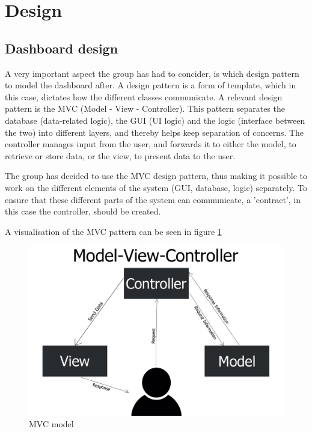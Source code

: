 \section{Design}

\subsection{Dashboard design}
A very important aspect the group has had to concider, is which design pattern
to model the dashboard after. A design pattern is a form of template, which in
this case, dictates how the different classes communicate. A relevant design
pattern is the MVC (Model - View - Controller). This pattern separates the
database (data-related logic), the GUI (UI logic) and the logic (interface
between the two) into different layers, and thereby helps keep separation of
concerns. The controller manages input from the user, and forwards it to either
the model, to retrieve or store data, or the view, to present data to the user.

The group has decided to use the MVC design pattern, thus making it possible to
work on the different elements of the system (GUI, database, logic) separately.
To ensure that these different parts of the system can communicate, a
'contract', in this case the controller, should be created.

A visualisation of the MVC pattern can be seen in figure \ref{figure:MVC_model}

\begin{figure}[ht]
    \centering
    \includegraphics[scale=0.35]{images/MVC_model.jpg}
    \caption{MVC model}
    \label{figure:MVC_model}
\end{figure}